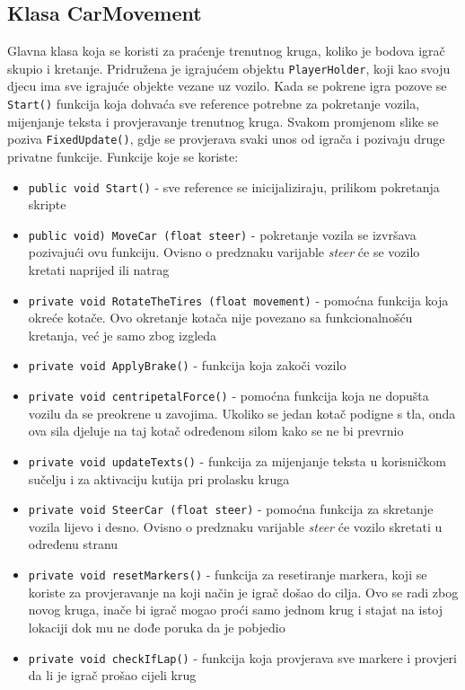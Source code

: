 \subsection{Klasa CarMovement}
Glavna klasa koja se koristi za praćenje trenutnog kruga, koliko je bodova igrač skupio i kretanje. Pridružena je igrajućem objektu \texttt{PlayerHolder}, koji kao svoju djecu ima sve igrajuće objekte vezane uz vozilo. Kada se pokrene igra pozove se \texttt{Start()} funkcija koja dohvaća sve reference potrebne za pokretanje vozila, mijenjanje teksta i provjeravanje trenutnog kruga. Svakom promjenom slike se poziva \texttt{FixedUpdate()}, gdje se provjerava svaki unos od igrača i pozivaju druge privatne funkcije. Funkcije koje se koriste:
\begin{itemize}
	\item \texttt{public void Start()} - sve reference se inicijaliziraju, prilikom pokretanja skripte
	\item \texttt{public void) MoveCar (float steer)} - pokretanje vozila se izvršava pozivajući ovu funkciju. Ovisno o predznaku varijable \emph{steer} će se vozilo kretati naprijed ili natrag
	\item \texttt{private void RotateTheTires (float movement)} - pomoćna funkcija koja okreće kotače. Ovo okretanje kotača nije povezano sa funkcionalnošću kretanja, već je samo zbog izgleda
	\item \texttt{private void ApplyBrake()} - funkcija koja zakoči vozilo
	\item \texttt{private void centripetalForce()} - pomoćna funkcija koja ne dopušta vozilu da se preokrene u zavojima. Ukoliko se jedan kotač podigne s tla, onda ova sila djeluje na taj kotač određenom silom kako se ne bi prevrnio
	\item \texttt{private void updateTexts()} - funkcija za mijenjanje teksta u korisničkom sučelju i za aktivaciju kutija pri prolasku kruga
	\item \texttt{private void SteerCar (float steer)} - pomoćna funkcija za skretanje vozila lijevo i desno. Ovisno o predznaku varijable \emph{steer} će vozilo skretati u određenu stranu
	\item \texttt{private void resetMarkers()} - funkcija za resetiranje markera, koji se koriste za provjeravanje na koji način je igrač došao do cilja. Ovo se radi zbog novog kruga, inače bi igrač mogao proći samo jednom krug i stajat na istoj lokaciji dok mu ne dođe poruka da je pobjedio
	\item \texttt{private void checkIfLap()} - funkcija koja provjerava sve markere i provjeri da li je igrač prošao cijeli krug

\end{itemize}
